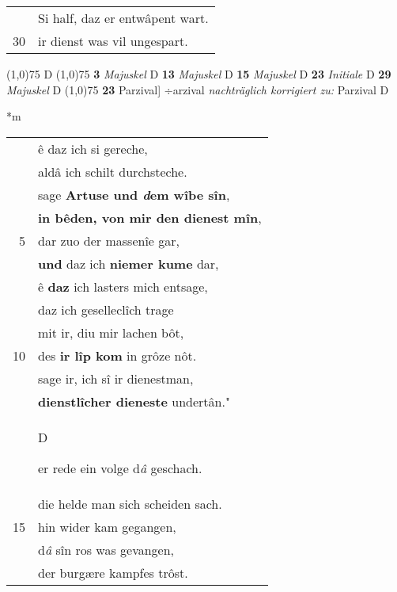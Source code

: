 \documentclass[8pt,a4paper,notitlepage]{article}
\begin{document}
\begin{table}[ht]
\begin{minipage}[t]{0.5\linewidth}
\begin{tabular}{rl}
 & Si half, daz er entwâpent wart.\\ 
30 & ir dienst was vil ungespart.\\ 
\end{tabular}
\scriptsize
\line(1,0){75} \newline
D \newline
\line(1,0){75} \newline
\textbf{3} \textit{Majuskel} D  \textbf{13} \textit{Majuskel} D  \textbf{15} \textit{Majuskel} D  \textbf{23} \textit{Initiale} D  \textbf{29} \textit{Majuskel} D  \newline
\line(1,0){75} \newline
\textbf{23} Parzival] ÷arzival \textit{nachträglich korrigiert zu:} Parzival D \newline
\end{minipage}
\hspace{0.5cm}
\begin{minipage}[t]{0.5\linewidth}
\small
\begin{center}*m
\end{center}
\begin{tabular}{rl}
 & ê daz ich si gereche,\\ 
 & aldâ ich schilt durchsteche.\\ 
 & sage \textbf{Artuse und \textit{d}em wîbe sîn},\\ 
 & \textbf{in bêden, von mir den dienest mîn},\\ 
5 & dar zuo der massenîe gar,\\ 
 & \textbf{und} daz ich \textbf{niemer kume} dar,\\ 
 & ê \textbf{daz} ich lasters mich entsage,\\ 
 & daz ich geselleclîch trage\\ 
 & mit ir, diu mir lachen bôt,\\ 
10 & des \textbf{ir lîp kom} in grôze nôt.\\ 
 & sage ir, ich sî ir dienestman,\\ 
 & \textbf{dienstlîcher dieneste} undertân."\\ 
 & \begin{large}D\end{large}er rede ein volge d\textit{â} geschach.\\ 
 & die helde man sich scheiden sach.\\ 
15 & hin wider kam gegangen,\\ 
 & d\textit{â} sîn ros was gevangen,\\ 
 & der burgære kampfes trôst.\\ 

\end{tabular}
\end{minipage}
\end{table}
\end{document}
